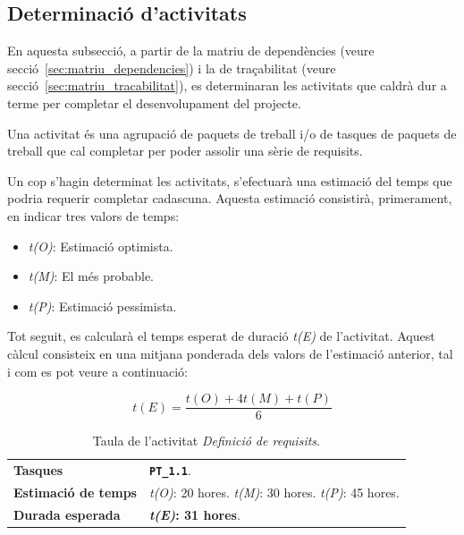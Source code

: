 \documentclass[a4paper,12pt]{ThesisStyle}
\begin{document}
\subsection{Determinació d'activitats}
\label{subsec:determinacio_activitats}

En aquesta subsecció, a partir de la matriu de dependències (veure secció~\ref{sec:matriu_dependencies}) i la de traçabilitat (veure secció~\ref{sec:matriu_tracabilitat}), es determinaran les activitats que caldrà dur a terme per completar el desenvolupament del projecte.

Una activitat és una agrupació de paquets de treball i/o de tasques de paquets de treball que cal completar per poder assolir una sèrie de requisits.

Un cop s'hagin determinat les activitats, s'efectuarà una estimació del temps que podria requerir completar cadascuna. Aquesta estimació consistirà, primerament, en indicar tres valors de temps:

\begin{itemize}
  \item \textit{t(O)}: Estimació optimista.
  \item \textit{t(M)}: El més probable.
  \item \textit{t(P)}: Estimació pessimista.
\end{itemize}

Tot seguit, es calcularà el temps esperat de duració \textit{t(E)} de l'activitat. Aquest càlcul consisteix en una mitjana ponderada dels valors de l'estimació anterior, tal i com es pot veure a continuació:

\begin{equation}
  t(E) = \frac{t(O) + 4t(M) + t(P)}{6}
\end{equation}

\begin{table}[H]
  \begin{tabularx}{\textwidth}{l | X}
    \toprule
    \rowcolor{Gray}
    \multicolumn{2}{c}{\texttt{\textbf{A1:}} Definició de requisits}\\
    \midrule[0.9pt]
    \textbf{Tasques}                 & \texttt{\textbf{PT\_1.1}}.\\
    \midrule
    \textbf{Estimació de temps}      & \textit{t(O)}: 20 hores.
    \newline \textit{t(M)}: 30 hores.
    \newline \textit{t(P)}: 45 hores.\\
    \midrule
    \textbf{Durada esperada}         & \textbf{\textit{t(E)}: 31 hores}.\\
    \bottomrule
  \end{tabularx}
  \caption{\label{taula:a1} Taula de l'activitat \emph{Definició de requisits}.}
\end{table}
\end{document}
